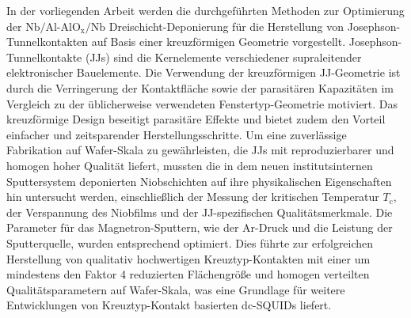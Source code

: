 \noindent
In der vorliegenden Arbeit werden die durchgeführten Methoden zur Optimierung der $\mathrm{Nb}/\mathrm{Al}$-$\mathrm{AlO}_\mathrm{x}/\mathrm{Nb}$ Dreischicht-Deponierung für die Herstellung von Josephson-Tunnelkontakten auf Basis einer kreuzförmigen Geometrie vorgestellt. Josephson-Tunnelkontakte (JJs) sind die Kernelemente verschiedener supraleitender elektronischer Bauelemente. Die Verwendung der kreuzförmigen JJ-Geometrie ist durch die Verringerung der Kontaktfläche sowie der parasitären Kapazitäten im Vergleich zu der üblicherweise verwendeten Fenstertyp-Geometrie motiviert. Das kreuzförmige Design beseitigt parasitäre Effekte und bietet zudem den Vorteil einfacher und zeitsparender Herstellungsschritte. Um eine zuverlässige Fabrikation auf Wafer-Skala zu gewährleisten, die JJs mit reproduzierbarer und homogen hoher Qualität liefert, mussten die in dem neuen institutsinternen Sputtersystem deponierten Niobschichten auf ihre physikalischen Eigenschaften hin untersucht werden, einschließlich der Messung der kritischen Temperatur $T_{\mathrm{c}}$, der Verspannung des Niobfilms und der JJ-spezifischen Qualitätsmerkmale. Die Parameter für das Magnetron-Sputtern, wie der Ar-Druck und die Leistung der Sputterquelle, wurden entsprechend optimiert. Dies führte zur erfolgreichen Herstellung von qualitativ hochwertigen Kreuztyp-Kontakten mit einer um mindestens den Faktor 4 reduzierten Flächengröße und homogen verteilten Qualitätsparametern auf Wafer-Skala, was eine Grundlage für weitere Entwicklungen von Kreuztyp-Kontakt basierten dc-SQUIDs liefert.

